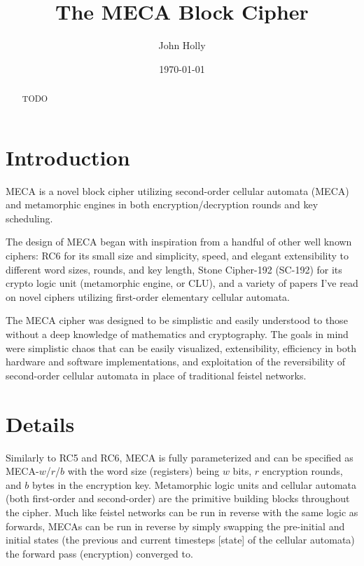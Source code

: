 \documentclass{article}
\title{\textbf{The MECA Block Cipher}}
\author{John Holly}
\date{\today}
\begin{document}
\maketitle

\begin{abstract}
\centering\begin{minipage}{\dimexpr\paperwidth-10cm}
TODO
\end{minipage}
\end{abstract}

\bigskip

\section{Introduction}

MECA is a novel block cipher utilizing second-order cellular automata (MECA) and metamorphic engines in both encryption/decryption rounds and key scheduling.

The design of MECA began with inspiration from a handful of other well known ciphers: RC6\cite{RC6} for its small size and simplicity, speed, and elegant extensibility to different word sizes, rounds, and key length, Stone Cipher-192 (SC-192)\cite{SC-192} for its crypto logic unit (metamorphic engine, or CLU), and a variety of papers I've read on novel ciphers utilizing first-order elementary cellular automata.

The MECA cipher was designed to be simplistic and easily understood to those without a deep knowledge of mathematics and cryptography. The goals in mind were simplistic chaos that can be easily visualized, extensibility, efficiency in both hardware and software implementations, and exploitation of the reversibility of second-order cellular automata in place of traditional feistel networks.

\section{Details}

Similarly to RC5 and RC6, MECA is fully parameterized and can be specified as MECA-$w$/$r$/$b$ with the word size (registers) being $w$ bits, $r$ encryption rounds, and $b$ bytes in the encryption key. Metamorphic logic units and cellular automata (both first-order and second-order) are the primitive building blocks throughout the cipher. Much like feistel networks can be run in reverse with the same logic as forwards, MECAs can be run in reverse by simply swapping the pre-initial and initial states (the previous and current timesteps [state] of the cellular automata) the forward pass (encryption) converged to.
\end{document}
